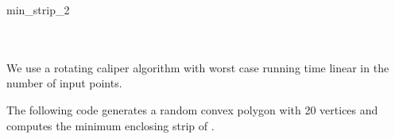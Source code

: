 \begin{ccRefFunction}{min_strip_2}
  \ccSeeAlso
  \\
  \\
  \\

  \ccImplementation We use a rotating caliper algorithm
  \cite{t-sgprc-83} with worst case running time linear in the number
  of input points.
    
  \ccExample The following code generates a random convex polygon
   with 20 vertices and computes the minimum enclosing
  strip of .


\end{ccRefFunction}
    

